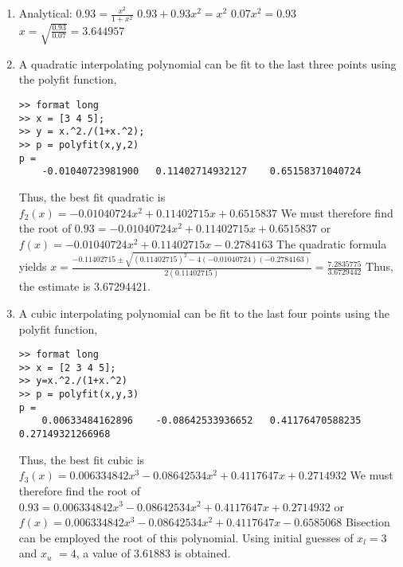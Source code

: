 \documentclass[../main.tex]{subfiles}
\begin{document}
\section{}
\begin{enumerate}[label=\bfseries(\alph*)]
\item Analytical:
	\bigbreak
$0.93=\frac{x^{2}}{1+x^{2}}$
	\bigbreak
$0.93+0.93 x^{2}=x^{2}$
	\bigbreak
$0.07 x^{2}=0.93$
	\bigbreak
$x=\sqrt{\frac{0.93}{0.07}}=3.644957$
	\bigbreak
\item A quadratic interpolating polynomial can be fit to the last three points using the polyfit function,
	\bigbreak
\begin{lstlisting}[numbers=none]
>> format long
>> x = [3 4 5];
>> y = x.^2./(1+x.^2);
>> p = polyfit(x,y,2)
p =
	-0.01040723981900	0.11402714932127	0.65158371040724 
\end{lstlisting}
	\bigbreak
Thus, the best fit quadratic is
	\bigbreak
$f_{2}(x)=-0.01040724 x^{2}+0.11402715 x+0.6515837$
	\bigbreak
We must therefore find the root of
	\bigbreak
$0.93=-0.01040724 x^{2}+0.11402715 x+0.6515837$
	\bigbreak
or
	\bigbreak
$f(x)=-0.01040724 x^{2}+0.11402715 x-0.2784163$
	\bigbreak
The quadratic formula yields
	\bigbreak
$x=\frac{-0.11402715 \pm \sqrt{(0.11402715)^{2}-4(-0.01040724)(-0.2784163)}}{2(0.11402715)}=\frac{7.2835775}{3.6729442}$
	\bigbreak
Thus, the estimate is 3.67294421.
	\bigbreak
\item A cubic interpolating polynomial can be fit to the last four points using the polyfit function,
	\bigbreak
\begin{lstlisting}[numbers=none]
>> format long
>> x = [2 3 4 5];
>> y=x.^2./(1+x.^2)
>> p = polyfit(x,y,3)
p =
	0.00633484162896	-0.08642533936652	0.41176470588235	0.27149321266968
\end{lstlisting}
	\bigbreak
Thus, the best fit cubic is
	\bigbreak
$f_{3}(x)=0.006334842 x^{3}-0.08642534 x^{2}+0.4117647 x+0.2714932$
	\bigbreak
We must therefore find the root of 
	\bigbreak
$0.93=0.006334842 x^{3}-0.08642534 x^{2}+0.4117647 x+0.2714932$
	\bigbreak
or
	\bigbreak
$f(x)=0.006334842 x^{3}-0.08642534 x^{2}+0.4117647 x-0.6585068$
	\bigbreak
Bisection can be employed the root of this polynomial. Using initial guesses of $x_{l}=3$ and $x_{u}$ $=4$, a value of $3.61883$ is obtained.
	\bigbreak
\end{enumerate}
\end{document}

